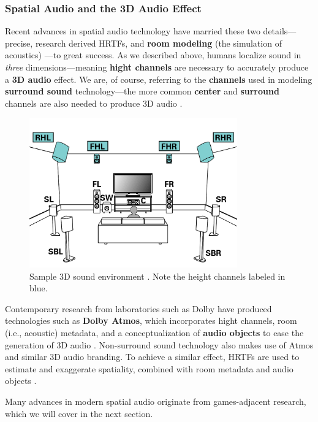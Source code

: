 \documentclass{report}
\newcommand{\tech}[1]{\textbf{#1}}
\begin{document}
\subsubsection{Spatial Audio and the 3D Audio Effect}
Recent advances in spatial audio technology have married these two details---precise, research derived HRTFs, and \textbf{room modeling} (the simulation of acoustics) \cite{roommodel}---to great success. As we described above, humans localize sound in \emph{three} dimensions---meaning \tech{hight channels} are necessary to accurately produce a \tech{3D audio} effect. We are, of course, referring to the \tech{channels} used in modeling \tech{surround sound} technology---the more common \tech{center} and \tech{surround} channels are also needed to produce 3D audio \cite{3daudio}. 


\begin{figure}
    \centering
    \includegraphics[width=0.8\textwidth]{surroundheight.png}
    \caption{Sample 3D sound environment \cite{heightPic}. Note the height channels labeled in blue.}
    \label{fig:height}
\end{figure}


Contemporary research from laboratories such as Dolby have produced technologies such as \tech{Dolby Atmos}, which incorporates hight channels, room (i.e., acoustic) metadata, and a conceptualization of \tech{audio objects} to ease the generation of 3D audio \cite{Pfanzagl-Cardone2023}. Non-surround sound technology also makes use of Atmos and similar 3D audio branding. To achieve a similar effect, HRTFs are used to estimate and exaggerate spatiality, combined with room metadata and audio objects \cite{dewey2024practitioners}.  

Many advances in modern spatial audio originate from games-adjacent research, which we will cover in the next section. 
\end{document}
